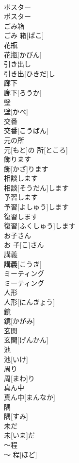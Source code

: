 \documentclass[8pt]{extreport}
\begin{document}
\begin{CJK}{UTF8}{min}
\\	ポスター	
\\	ポスター	
\\	ごみ箱	
\\	ごみ 箱[ばこ]	
\\	花瓶	
\\	花瓶[かびん]	
\\	引き出し	
\\	引き出[ひきだ]し	
\\	廊下	
\\	廊下[ろうか]	
\\	壁	
\\	壁[かべ]	
\\	交番	
\\	交番[こうばん]	
\\	元の所	
\\	元[もと]の 所[ところ]	
\\	飾ります	
\\	飾[かざ]ります	
\\	相談します	
\\	相談[そうだん]します	
\\	予習します	
\\	予習[よしゅう]します	
\\	復習します	
\\	復習[ふくしゅう]します	
\\	お子さん	
\\	お 子[こ]さん	
\\	講義	
\\	講義[こうぎ]	
\\	ミーティング	
\\	ミーティング	
\\	人形	
\\	人形[にんぎょう]	
\\	鏡	
\\	鏡[かがみ]	
\\	玄関	
\\	玄関[げんかん]	
\\	池	
\\	池[いけ]	
\\	周り	
\\	周[まわ]り	
\\	真ん中	
\\	真ん中[まんなか]	
\\	隅	
\\	隅[すみ]	
\\	未だ	
\\	未[いま]だ	
\\	〜程	
\\	〜 程[ほど]	

\end{CJK}
\end{document}
